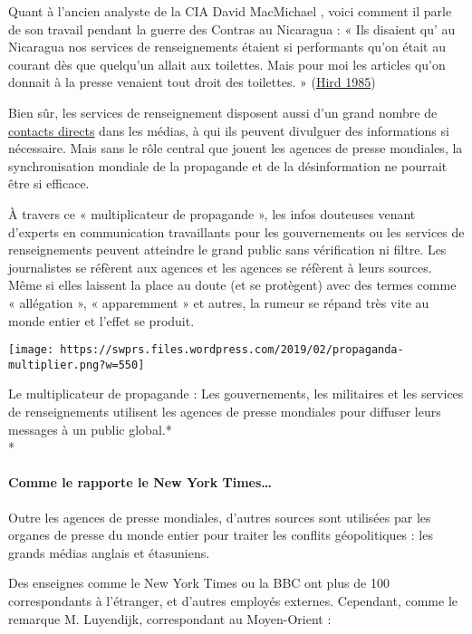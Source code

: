 Quant à l'ancien analyste de la CIA David MacMichael , voici comment il
parle de son travail pendant la guerre des Contras au Nicaragua : « Ils
disaient qu' au Nicaragua nos services de renseignements étaient si
performants qu'on était au courant dès que quelqu'un allait aux
toilettes. Mais pour moi les articles qu'on donnait à la presse venaient
tout droit des toilettes. »
(\href{https://swprs.org/video-the-cia-and-the-media/}{Hird 1985})

Bien sûr, les services de renseignement disposent aussi d'un grand
nombre de
\href{http://www.carlbernstein.com/magazine_cia_and_media.php}{contacts
directs} dans les médias, à qui ils peuvent divulguer des informations
si nécessaire. Mais sans le rôle central que jouent les agences de
presse mondiales, la synchronisation mondiale de la propagande et de la
désinformation ne pourrait être si efficace.

À travers ce « multiplicateur de propagande », les infos douteuses
venant d'experts en communication travaillants pour les gouvernements ou
les services de renseignements peuvent atteindre le grand public sans
vérification ni filtre. Les journalistes se réfèrent aux agences et les
agences se réfèrent à leurs sources. Même si elles laissent la place au
doute (et se protègent) avec des termes comme « allégation », «
apparemment » et autres, la rumeur se répand très vite au monde entier
et l'effet se produit.

\texttt{[image: https://swprs.files.wordpress.com/2019/02/propaganda-multiplier.png?w=550]}

Le multiplicateur de propagande : Les gouvernements, les militaires et
les services de renseignements utilisent les agences de presse mondiales
pour diffuser leurs messages à un public global.*\\
*

\hypertarget{comme-le-rapporte-le-new-york-times}{%
\paragraph{Comme le rapporte le New York
Times\ldots{}}\label{comme-le-rapporte-le-new-york-times}}

Outre les agences de presse mondiales, d'autres sources sont utilisées
par les organes de presse du monde entier pour traiter les conflits
géopolitiques : les grands médias anglais et étasuniens.

Des enseignes comme le New York Times ou la BBC ont plus de 100
correspondants à l'étranger, et d'autres employés externes. Cependant,
comme le remarque M. Luyendijk, correspondant au Moyen-Orient :

